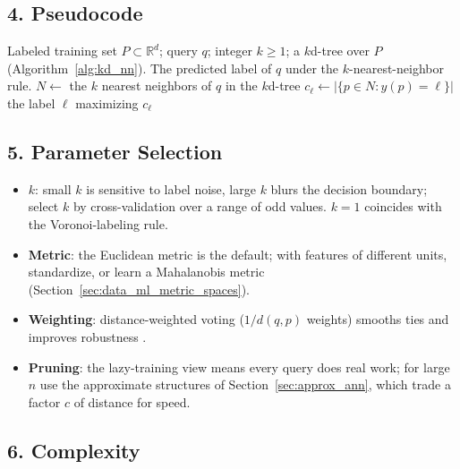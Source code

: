 \subsection{4. Pseudocode}

\begin{algorithm}[htbp]
\caption{$k$-Nearest-Neighbor Classification with a $k$d-Tree}
\label{alg:data_ml_knn}
\begin{algorithmic}[1]
\Require Labeled training set $P \subset \mathbb{R}^d$; query $q$; integer $k \geq 1$; a $k$d-tree over $P$ (Algorithm~\ref{alg:kd_nn}).
\Ensure The predicted label of $q$ under the $k$-nearest-neighbor rule.
  \State $N \gets$ the $k$ nearest neighbors of $q$ in the $k$d-tree 
    \State $c_\ell \gets |\{p \in N : y(p) = \ell\}|$
  \EndFor
  \State \Return the label $\ell$ maximizing $c_\ell$ 
\EndFunction
\end{algorithmic}
\end{algorithm}

\subsection{5. Parameter Selection}

\begin{itemize}
\item \textbf{$k$}: small $k$ is sensitive to label noise, large $k$ blurs
  the decision boundary; select $k$ by cross-validation over a range of odd
  values. $k = 1$ coincides with the Voronoi-labeling rule.
\item \textbf{Metric}: the Euclidean metric is the default; with features
  of different units, standardize, or learn a Mahalanobis metric
  (Section~\ref{sec:data_ml_metric_spaces}).
\item \textbf{Weighting}: distance-weighted voting
  ($1/d(q,p)$ weights) smooths ties and improves robustness
  \cite{duda2001}.
\item \textbf{Pruning}: the lazy-training view means every query does real
  work; for large $n$ use the approximate structures of
  Section~\ref{sec:approx_ann}, which trade a factor $c$ of distance for
  speed.
\end{itemize}

\subsection{6. Complexity}

